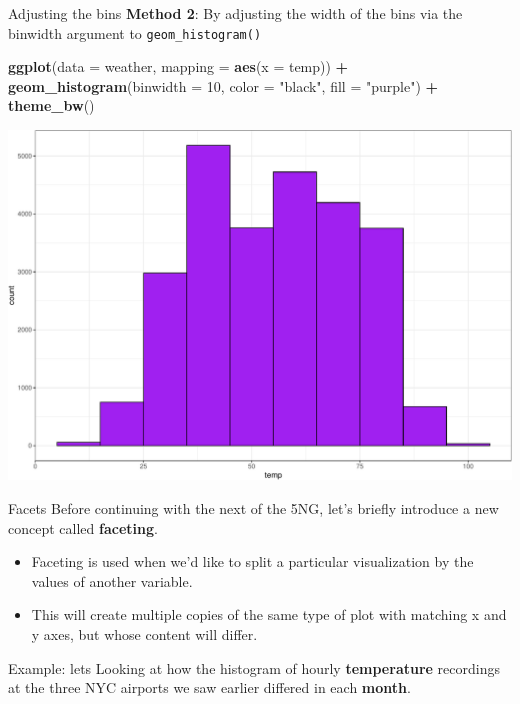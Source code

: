 \documentclass[
  ignorenonframetext,
]{beamer}
\newenvironment{Shaded}{\begin{snugshade}}{\end{snugshade}}
\newcommand{\AttributeTok}[1]{\textcolor[rgb]{0.13,0.29,0.53}{#1}}
\newcommand{\DecValTok}[1]{\textcolor[rgb]{0.00,0.00,0.81}{#1}}
\newcommand{\FunctionTok}[1]{\textcolor[rgb]{0.13,0.29,0.53}{\textbf{#1}}}
\newcommand{\NormalTok}[1]{#1}
\newcommand{\SpecialCharTok}[1]{\textcolor[rgb]{0.81,0.36,0.00}{\textbf{#1}}}
\newcommand{\StringTok}[1]{\textcolor[rgb]{0.31,0.60,0.02}{#1}}
\begin{document}
\begin{frame}[fragile]{Adjusting the bins}
\protect\hypertarget{adjusting-the-bins-1}{}
\textbf{Method 2}: By adjusting the width of the bins via the binwidth
argument to \texttt{geom\_histogram()}

\tiny

\begin{Shaded}
\begin{Highlighting}[]
\FunctionTok{ggplot}\NormalTok{(}\AttributeTok{data =}\NormalTok{ weather, }\AttributeTok{mapping =} \FunctionTok{aes}\NormalTok{(}\AttributeTok{x =}\NormalTok{ temp)) }\SpecialCharTok{+}
  \FunctionTok{geom\_histogram}\NormalTok{(}\AttributeTok{binwidth =} \DecValTok{10}\NormalTok{, }\AttributeTok{color =} \StringTok{"black"}\NormalTok{, }\AttributeTok{fill =} \StringTok{"purple"}\NormalTok{) }\SpecialCharTok{+} 
  \FunctionTok{theme\_bw}\NormalTok{()}
\end{Highlighting}
\end{Shaded}

\begin{center}\includegraphics[width=0.7\linewidth,height=0.5\textheight]{Week2_Lect_files/figure-beamer/unnamed-chunk-29-1} \end{center}
\normalsize
\end{frame}

\begin{frame}{Facets}
\protect\hypertarget{facets}{}
Before continuing with the next of the 5NG, let's briefly introduce a
new concept called \textbf{faceting}.

\begin{itemize}
\item
  Faceting is used when we'd like to split a particular visualization by
  the values of another variable.
\item
  This will create multiple copies of the same type of plot with
  matching x and y axes, but whose content will differ.
\end{itemize}

Example: lets Looking at how the histogram of hourly
\textbf{temperature} recordings at the three NYC airports we saw earlier
differed in each \textbf{month}.
\end{frame}
\end{document}
